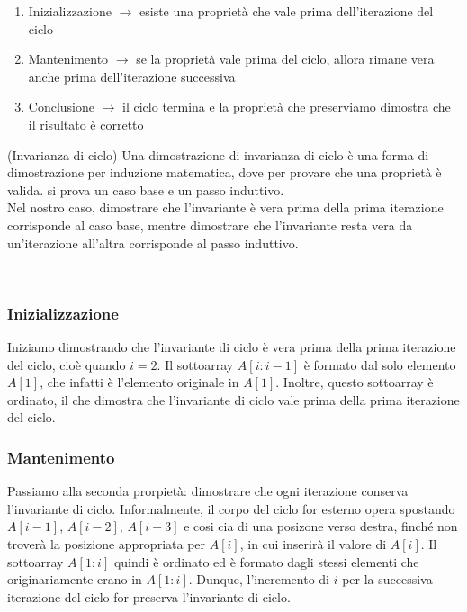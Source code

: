 \begin{enumerate}
    \item Inizializzazione $\rightarrow$ esiste una proprietà che vale prima dell'iterazione del ciclo
    \item Mantenimento $\rightarrow$ se la proprietà vale prima del ciclo, allora rimane vera anche prima dell'iterazione successiva
    \item Conclusione $\rightarrow$ il ciclo termina e la proprietà che preserviamo dimostra che il risultato è corretto
\end{enumerate}

\noindent \colorbox{SALZO}{\parbox{\dimexpr\linewidth-2\fboxsep}{\begin{definition}
    (Invarianza di ciclo) Una dimostrazione di invarianza di ciclo è una forma di dimostrazione per induzione matematica, dove per provare che una proprietà è valida. si prova un caso base e un passo induttivo.\\
    Nel nostro caso, dimostrare che l'invariante è vera prima della prima iterazione corrisponde al caso base, mentre dimostrare che l'invariante resta vera da un'iterazione all'altra corrisponde al passo induttivo.
\end{definition}}}\\

\subsubsection{Inizializzazione}
Iniziamo dimostrando che l'invariante di ciclo è vera prima della prima iterazione del ciclo, cioè quando $i=2$. Il sottoarray $A[i : i-1]$ è formato dal solo elemento $A[1]$, che infatti è l'elemento originale in $A[1]$. Inoltre, questo sottoarray è ordinato, il che dimostra che l'invariante di ciclo vale prima della prima iterazione del ciclo.

\subsubsection{Mantenimento}
Passiamo alla seconda prorpietà: dimostrare che ogni iterazione conserva l'invariante di ciclo. Informalmente, il corpo del ciclo for esterno opera spostando $A[i-1]$, $A[i-2]$, $A[i-3]$ e cosi cia di una posizone verso destra, finché non troverà la posizione appropriata per $A[i]$, in cui inserirà il valore di $A[i]$. Il sottoarray $A[1 : i]$ quindi è ordinato ed è formato dagli stessi elementi che originariamente erano in $A[1 : i]$. Dunque, l'incremento di $i$ per la successiva iterazione del ciclo for preserva l'invariante di ciclo.

